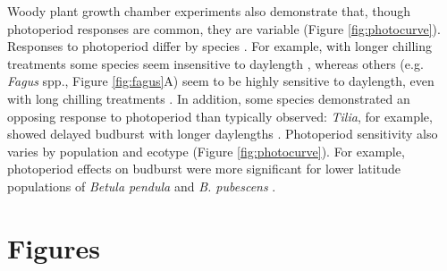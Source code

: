 \documentclass{article}
\begin{document}
\par Woody plant growth chamber experiments also demonstrate that, though photoperiod responses are common, they are variable (Figure \ref{fig:photocurve}). Responses to photoperiod differ by species \citep[e.g.,][]{Heide:1993a,Howe:1996,Basler:2012, Basler:2014aa,zohner2016,flynn2018}.
For example, with longer chilling treatments some species seem insensitive to daylength \citep[e.g.,\emph{Hammamelis} spp., \emph{Prunus} spp.][]{zohner2016}, %
whereas others (e.g. \emph{Fagus} spp., Figure \ref{fig:fagus}A) seem to be highly sensitive to daylength, even with long chilling treatments \citep{zohner2016}. In addition, some species demonstrated an opposing response to photoperiod than typically observed: \emph{Tilia}, for example, showed delayed budburst with longer daylengths \citep[Figure \ref{fig:photocurve},][]{Ashby:1962aa}. %
Photoperiod sensitivity also varies by population and ecotype \citep[e.g.,][]{Partanen:2005aa} (Figure \ref{fig:photocurve}). For example, photoperiod effects on budburst were more significant for lower latitude populations of \emph{Betula pendula} and \emph{B. pubescens} \citep{Partanen:2005aa}. %



\clearpage


\section* {Figures}
\end{document}
